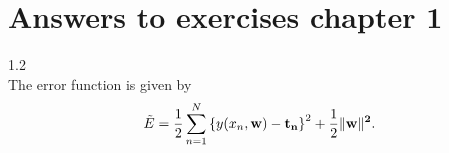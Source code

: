\documentclass[a4j,11pt]{jarticle}
\begin{document}
\section{Answers to exercises chapter 1}
1.2 \\
The error function is given by
\begin{eqnarray}
 \tilde{E} = \frac{1}{2} \sum_{n=1}^N
  \left \{
   y(x_n, \bf{w}) - t_n
  \right \}^2 + \frac{1}{2} \| \bf{w} \|^2 .
\end{eqnarray}
\end{document}
